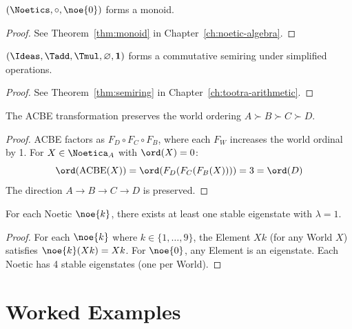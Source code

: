 \begin{theorem}
\label{thm:noetic-monoid-formal}
$(\Noetics, \circ, \noe{0})$ forms a monoid.
\end{theorem}

\begin{proof}
See Theorem~\ref{thm:monoid} in Chapter~\ref{ch:noetic-algebra}.
\end{proof}

\begin{theorem}
\label{thm:tootra-semiring-formal}
$(\Ideas, \Tadd, \Tmul, \varnothing, \mathbf{1})$ forms a commutative semiring under simplified operations.
\end{theorem}

\begin{proof}
See Theorem~\ref{thm:semiring} in Chapter~\ref{ch:tootra-arithmetic}.
\end{proof}

\begin{theorem}
\label{thm:acbe-order}
The ACBE transformation preserves the world ordering $A \succ B \succ C \succ D$.
\end{theorem}

\begin{proof}
ACBE factors as $F_D \circ F_C \circ F_B$, where each $F_W$ increases the world ordinal by 1. For $X \in \Noetica_A$ with $\ord(X) = 0$:
\[
\ord(\mathrm{ACBE}(X)) = \ord(F_D(F_C(F_B(X)))) = 3 = \ord(D)
\]
The direction $A \to B \to C \to D$ is preserved.
\end{proof}

\begin{theorem}
\label{thm:eigenmodes}
For each Noetic $\noe{k}$, there exists at least one stable eigenstate with $\lambda = 1$.
\end{theorem}

\begin{proof}
For each $\noe{k}$ where $k \in \{1,\ldots,9\}$, the Element $Xk$ (for any World $X$) satisfies $\noe{k}(Xk) = Xk$. For $\noe{0}$, any Element is an eigenstate. Each Noetic has 4 stable eigenstates (one per World).
\end{proof}

\chapter{Worked Examples}
\label{ch:examples}

